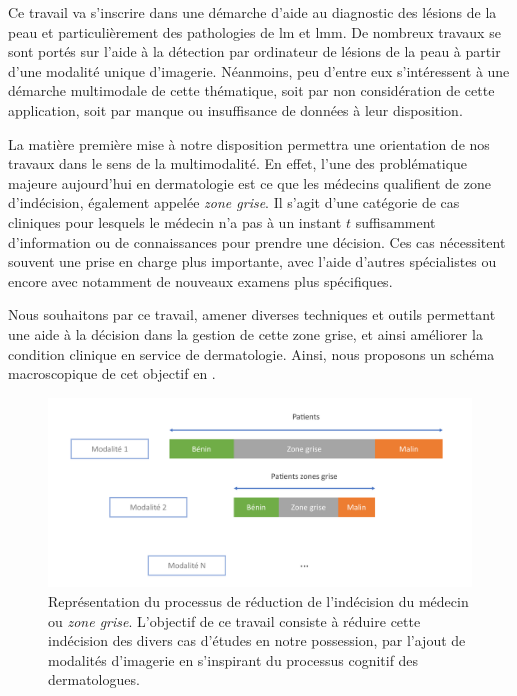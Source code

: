 \renewcommand{\thechapter}{\roman{chapter}}
\setcounter{chapter}{2}
\setcounter{figure}{0}

\label{chap:preamble_context}

Ce travail va s'inscrire dans une démarche d'aide au diagnostic des lésions de la peau et particulièrement des pathologies de \gls{lm} et \gls{lmm}. De nombreux travaux se sont portés sur l'aide à la détection par ordinateur de lésions de la peau à partir d'une modalité unique d'imagerie. Néanmoins, peu d'entre eux s'intéressent à une démarche multimodale de cette thématique, soit par non considération de cette application, soit par manque ou insuffisance de données à leur disposition.\par

La matière première mise à notre disposition permettra une orientation de nos travaux dans le sens de la multimodalité. En effet, l'une des problématique majeure aujourd'hui en dermatologie est ce que les médecins qualifient de zone d'indécision, également appelée \textit{zone grise}. Il s'agit d'une catégorie de cas cliniques pour lesquels le médecin n'a pas à un instant $t$ suffisamment d'information ou de connaissances pour prendre une décision. Ces cas nécessitent souvent une prise en charge plus importante, avec l'aide d'autres spécialistes ou encore avec notamment de nouveaux examens plus spécifiques.\par

Nous souhaitons par ce travail, amener diverses techniques et outils permettant une aide à la décision dans la gestion de cette zone grise, et ainsi améliorer la condition clinique en service de dermatologie. Ainsi, nous proposons un schéma macroscopique de cet objectif en .\par

\begin{figure}[H]
    \centering
    \includegraphics[width=\linewidth]{contents/ii_preamble_context/resources/scheme_reduce_indecision.pdf}
    \caption{Représentation du processus de réduction de l'indécision du médecin ou \textit{zone grise}. L'objectif de ce travail consiste à réduire cette indécision des divers cas d'études en notre possession, par l'ajout de modalités d'imagerie en s'inspirant du processus cognitif des dermatologues.}
    \label{fig:scheme_reduce_indecision}
\end{figure}\par

